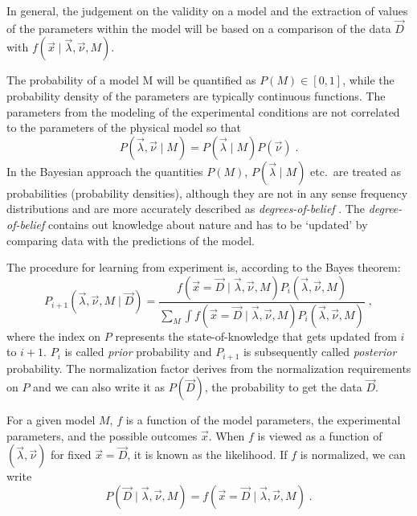 In general, the judgement on the validity on a model and the extraction of values of the parameters within the model will be based on a comparison of the data $\vec{D}$ with $f(\vec{x}\mid\vec{\lambda},\vec{\nu},M)$.

 The probability of a model M will be quantified as $P(M)\in[0,1]$, while the probability density of the parameters are typically continuous functions. The parameters from the modeling of the experimental conditions are not correlated to the parameters of the physical model so that
\begin{equation}P(\vec{\lambda},\vec{\nu}\mid M)=P(\vec{\lambda}\mid M)P(\vec{\nu})\;.\end{equation}
In the Bayesian approach the quantities $P(M)$, $P(\vec{\lambda}\mid M)$ etc.~are treated as probabilities (probability densities), although they are not in any sense frequency distributions and are more accurately described as \emph{degrees-of-belief} \cite{bayesbook}. The \emph{degree-of-belief} contains out knowledge about nature and has to be `updated' by comparing data with the predictions of the model.

The procedure for learning from experiment is, according to the Bayes theorem:
\begin{equation}P_{i+1}(\vec{\lambda},\vec{\nu},M\mid\vec{D})=\frac{f(\vec{x}=\vec{D}\mid\vec{\lambda},\vec{\nu},M)P_i(\vec{\lambda},\vec{\nu},M)}{\sum_M\int f(\vec{x}=\vec{D}\mid\vec{\lambda},\vec{\nu},M)P_i(\vec{\lambda},\vec{\nu},M)}\;,\end{equation}
where the index on $P$ represents the state-of-knowledge that gets updated from $i$ to $i+1$. $P_i$ is called \emph{prior} probability and $P_{i+1}$ is subsequently called \emph{posterior} probability. The normalization factor derives from the normalization requirements on $P$ and we can also write it as $P(\vec{D})$, the probability to get the data $\vec{D}$.

For a given model $M$, $f$ is a function of the model parameters, the experimental parameters, and the possible outcomes $\vec{x}$. When $f$ is viewed as a function of $(\vec{\lambda},\vec{\nu})$ for fixed $\vec{x}=\vec{D}$, it is known as the likelihood. If $f$ is normalized, we can write
\begin{equation}P(\vec{D}\mid\vec{\lambda},\vec{\nu},M)=f(\vec{x}=\vec{D}\mid\vec{\lambda},\vec{\nu},M)\;.\end{equation}

